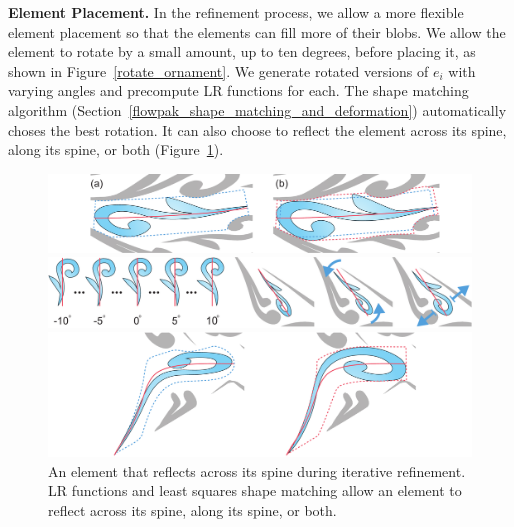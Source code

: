 \textbf{Element Placement.}
In the refinement process, we allow a more flexible element placement so that
the elements can fill more of their blobs.  We allow the element
to rotate by a small amount, up to ten degrees, before placing it, as shown in
Figure~\ref{rotate_ornament}. 
We generate rotated versions of $e_{i}$ 
with varying angles 
and precompute LR functions for each. The shape matching algorithm
(Section~\ref{flowpak_shape_matching_and_deformation}) automatically choses the best rotation. It
can also choose to reflect the element across its spine, along its spine, or both (Figure~\ref{flip_shape}).

\begin{figure}
\centering
\includegraphics[width=1.0\textwidth]{figures/flowpak/stretch.pdf}
\caption[Stretching an element]
{\label{stretch_ornament}
(a) An element with its sub-region blob shown in dashed blue line. Note that any blob is constrained by the neighbouring elements. 
(b) The dashed red line is the grown blob, which accommodates an enlarged element.}

\bigskip
\bigskip
\includegraphics[width=1.0\textwidth]{figures/flowpak/rotate_ornament.pdf}
\caption[Rotating an element]
{\label{rotate_ornament}
: rotated versions of the original element. 
         The best rotation angle is chosen via least squares matching.
         : original, rotated, and enlarged versions of an element.}
\bigskip
\bigskip

\includegraphics[width=1.0\textwidth]{figures/flowpak/flip.pdf}
\caption[Reflecting an element]
{\label{flip_shape}
An element that reflects across its spine during iterative refinement.
LR functions and least squares shape matching allow an element to reflect
across its spine, along its spine, or both.}
\end{figure}


